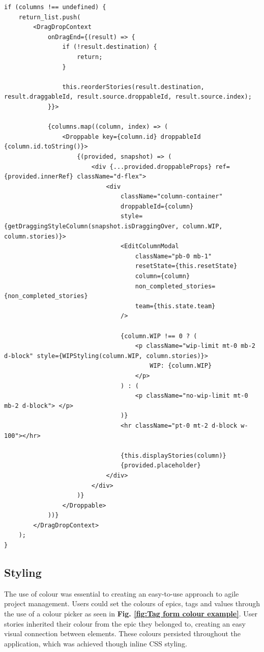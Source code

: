 \documentclass[l4proj.tex]{subfiles}
\begin{document}
\begin{lstlisting}[caption= Drag and drop code snippet from the Tracking Dashboard]
if (columns !== undefined) {
    return_list.push(
        <DragDropContext
            onDragEnd={(result) => {
                if (!result.destination) {
                    return;
                }

                this.reorderStories(result.destination, result.draggableId, result.source.droppableId, result.source.index);
            }}>
            
            {columns.map((column, index) => (
                <Droppable key={column.id} droppableId {column.id.toString()}>
                    {(provided, snapshot) => (
                        <div {...provided.droppableProps} ref={provided.innerRef} className="d-flex">
                            <div
                                className="column-container"
                                droppableId={column}
                                style={getDraggingStyleColumn(snapshot.isDraggingOver, column.WIP, column.stories)}>
                                <EditColumnModal
                                    className="pb-0 mb-1"
                                    resetState={this.resetState}
                                    column={column}
                                    non_completed_stories={non_completed_stories}
                                    team={this.state.team}
                                />
                    
                                {column.WIP !== 0 ? (
                                    <p className="wip-limit mt-0 mb-2 d-block" style={WIPStyling(column.WIP, column.stories)}>
                                        WIP: {column.WIP}
                                    </p>
                                ) : (
                                    <p className="no-wip-limit mt-0 mb-2 d-block"> </p>
                                )}
                                <hr className="pt-0 mt-2 d-block w-100"></hr>

                                {this.displayStories(column)}
                                {provided.placeholder}
                            </div>
                        </div>
                    )}
                </Droppable>
            ))}
        </DragDropContext>
    );
}
\end{lstlisting}
\label{listing: drag and drop} 

\subsection{Styling}
The use of colour was essential to creating an easy-to-use approach to agile project management. Users could set the colours of epics, tags and values through the use of a colour picker as seen in \textbf{Fig. \ref{fig:Tag form colour example}}. User stories inherited their colour from the epic they belonged to, creating an easy visual connection between elements. These colours persisted throughout the application, which was achieved though inline CSS styling. 
\end{document}
